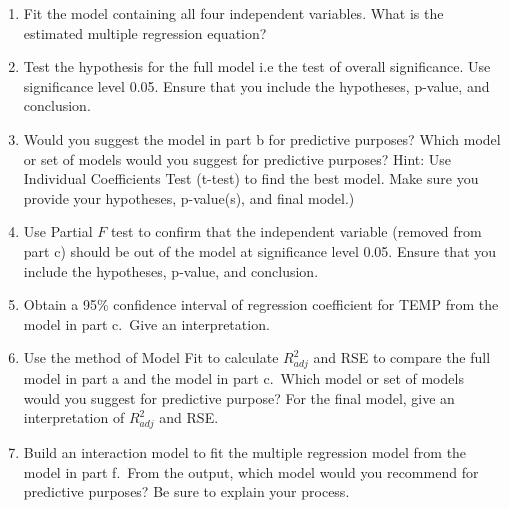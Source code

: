 \documentclass[
]{article}
\begin{document}
\begin{enumerate}
\def\labelenumi{\alph{enumi}.}
\item
  Fit the model containing all four independent variables. What is the
  estimated multiple regression equation?
\item
  Test the hypothesis for the full model i.e the test of overall
  significance. Use significance level 0.05. Ensure that you include the
  hypotheses, p-value, and conclusion.
\item
  Would you suggest the model in part b for predictive purposes? Which
  model or set of models would you suggest for predictive purposes?
  Hint: Use Individual Coefficients Test (t-test) to find the best
  model. Make sure you provide your hypotheses, p-value(s), and final
  model.)
\item
  Use Partial \(F\) test to confirm that the independent variable
  (removed from part c) should be out of the model at significance level
  0.05. Ensure that you include the hypotheses, p-value, and conclusion.
\item
  Obtain a 95\% confidence interval of regression coefficient for TEMP
  from the model in part c.~Give an interpretation.
\item
  Use the method of Model Fit to calculate \(R^2_{adj}\) and RSE to
  compare the full model in part a and the model in part c.~Which model
  or set of models would you suggest for predictive purpose? For the
  final model, give an interpretation of \(R^2_{adj}\) and RSE.
\item
  Build an interaction model to fit the multiple regression model from
  the model in part f.~From the output, which model would you recommend
  for predictive purposes? Be sure to explain your process.
\end{enumerate}
\end{document}
